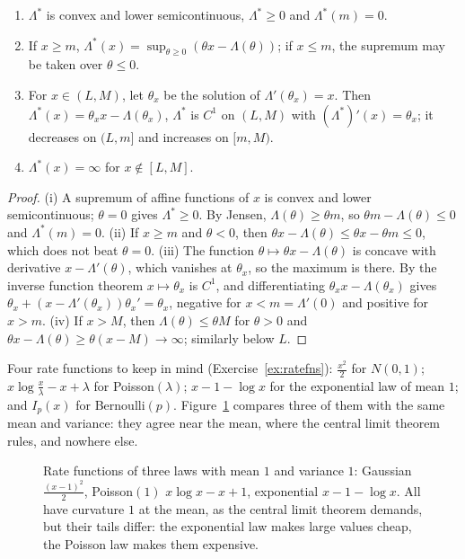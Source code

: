 \begin{lemma}\label{lem:ratefn}
\begin{enumerate}[label=(\roman*)]
\item $\Lambda^*$ is convex and lower semicontinuous, $\Lambda^*\ge0$ and $\Lambda^*(m)=0$.
\item If $x\ge m$, $\Lambda^*(x)=\sup_{\theta\ge0}(\theta x-\Lambda(\theta))$; if $x\le m$, the supremum may be taken over $\theta\le0$.
\item For $x\in(L,M)$, let $\theta_x$ be the solution of $\Lambda'(\theta_x)=x$. Then $\Lambda^*(x)=\theta_xx-\Lambda(\theta_x)$, $\Lambda^*$ is $C^1$ on $(L,M)$ with
$(\Lambda^*)'(x)=\theta_x$; it decreases on $(L,m]$ and increases on $[m,M)$.
\item $\Lambda^*(x)=\infty$ for $x\notin[L,M]$.
\end{enumerate}
\end{lemma}
\begin{proof}
(i) A supremum of affine functions of $x$ is convex and lower semicontinuous; $\theta=0$ gives $\Lambda^*\ge0$. By Jensen, $\Lambda(\theta)\ge\theta m$, so $\theta m-\Lambda(\theta)\le0$ and $\Lambda^*(m)=0$.
(ii) If $x\ge m$ and $\theta<0$, then $\theta x-\Lambda(\theta)\le\theta x-\theta m\le0$, which does not beat $\theta=0$. (iii) The function $\theta\mapsto\theta x-\Lambda(\theta)$ is concave with
derivative $x-\Lambda'(\theta)$, which vanishes at $\theta_x$, so the maximum is there. By the inverse function theorem $x\mapsto\theta_x$ is $C^1$, and differentiating
$\theta_xx-\Lambda(\theta_x)$ gives $\theta_x+(x-\Lambda'(\theta_x))\theta_x'=\theta_x$, negative for $x<m=\Lambda'(0)$ and positive for $x>m$. (iv) If $x>M$, then $\Lambda(\theta)\le\theta M$ for $\theta>0$
and $\theta x-\Lambda(\theta)\ge\theta(x-M)\to\infty$; similarly below $L$.
\end{proof}

Four rate functions to keep in mind (Exercise~\ref{ex:ratefns}): $\frac{x^2}2$ for $N(0,1)$; $x\log\frac x\lambda-x+\lambda$ for Poisson$(\lambda)$; $x-1-\log x$ for the exponential law
of mean $1$; and $I_p(x)$ for Bernoulli$(p)$. Figure~\ref{fig:ratefns} compares three of them with the same mean and variance: they agree near the mean,
where the central limit theorem rules, and nowhere else.

\begin{figure}[ht]
\centering{}
\caption{Rate functions of three laws with mean $1$ and variance $1$: Gaussian $\frac{(x-1)^2}2$, Poisson$(1)$ $x\log x-x+1$, exponential $x-1-\log x$. All have curvature $1$
at the mean, as the central limit theorem demands, but their tails differ: the exponential law makes large values cheap, the Poisson law makes them expensive.}
\label{fig:ratefns}
\end{figure}

